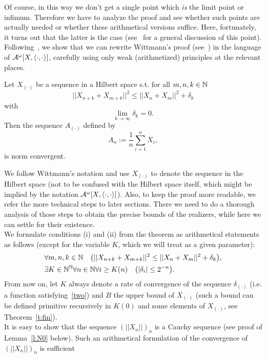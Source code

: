 Of course, in this way we don't get a single point which {\em is} the limit point or infimum. Therefore
we have to analyze the proof and see whether such points are actually needed or whether
these arithmetical versions suffice. Here, fortunately, it turns out that 
the latter is the case (see~\cite{Kohlenbach1998} for a general discussion of this point).\\
Following~\cite{Kohlenbach08}, we show that we can rewrite Wittmann's proof (see~\cite{Wittmann90}) 
in the language of $\mathcal{A}^\omega[X,\langle\cdot,\cdot\rangle]$, carefully using only weak (arithmetized) principles at the relevant places.
\begin{thm}\label{t:fin21ar}
Let $X_{(\cdot)}$ be a sequence in a Hilbert space s.t. for all $m,n,k\in\mathbb{N}$
\[
||X_{n+k} + X_{m+k}||^2 \leq ||X_{n} + X_{m}||^2+\delta_k\tag{i}
\]
with
\[
\lim_{k\to\infty} \delta_{k}=0.\tag{ii}
\]
Then the sequence $A_{(\cdot)}$ defined by
\[
A_n:=\frac{1}{n}\sum^n_{i=1}X_i,
\]
is norm convergent.
\end{thm}
We follow Wittmann's notation and use $X_{(\cdot)}$ to denote the sequence in the
Hilbert space (not to be confused with the Hilbert space itself, which might be implied by the notation $\mathcal{A}^\omega[X,\langle\cdot,\cdot\rangle]$). 
Also, to keep the proof more readable, we refer the more technical steps to later sections. There we need to do 
a thorough analysis of those steps to obtain the precise bounds of the realizers, while here we 
can settle for their existence.\\
We formulate conditions (i) and (ii) from the theorem as arithmetical statements as follows (except for
the variable $K$, which we will treat as a given parameter):
\begin{align}
&\forall m,n,k\in\mathbb{N} \quad \big( ||X_{n+k}+X_{m+k}||^2 \leq ||X_{n}+X_{m}||^2 + \delta_k\big),\label{l:one}\\
&\exists K\in\mathbb{N}^{\mathbb{N}}\forall n\in\mathbb{N} \forall i\geq K(n)\quad \big( |\delta_i|\leq 2^{-n}\big).\label{l:two}
\end{align}
From now on, let $K$ always denote a rate of convergence of the sequence $\delta_{(\cdot)}$ 
(i.e. a function satisfying~\eqref{two}) and $B$ the upper bound of $X_{(\cdot)}$ (such a bound
can be defined primitive recursively in $K(0)$ and some elements of $X_{(\cdot)}$, see Theorem~\ref{t:fin}).\\
It is easy to show that the sequence $(||X_n||)_n$ is a Cauchy sequence 
(see proof of Lemma~\ref{l:N0} below). Such an arithmetical formulation
of the convergence of $(||X_n||)_n$ is sufficient
